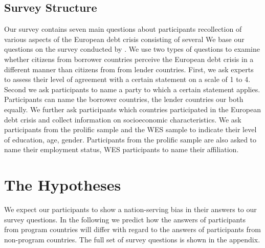 \documentclass[12pt]{article}
\begin{document}
\subsection{Survey Structure}
Our survey contains seven main questions about participants recollection of various aspects of the European debt crisis consisting of several  We base our questions on the survey conducted by \cite{dezso}. We use two types of questions to examine whether citizens from borrower countries perceive the European debt crisis in a different manner than citizens from from lender countries. First, we ask experts to assess their level of agreement with a certain statement on a scale of 1 to 4. Second we ask participants to name a party to which a certain statement applies. Participants can name the borrower countries, the lender countries our both equally. We further ask participants which countries participated in the European debt crisis and collect information on socioeconomic characteristics. We ask participants from the prolific sample and the WES sample to indicate their level of education, age, gender. Participants from the prolific sample are also asked to name their employment status, WES participants to name their affiliation. 

\section{The  Hypotheses}
We expect our participants to show a nation-serving bias in their answers to our survey questions. In the following we predict how the answers of participants from program countries will differ with regard to the answers of participants from non-program countries. The full set of survey questions is shown in the appendix. 
\end{document}
